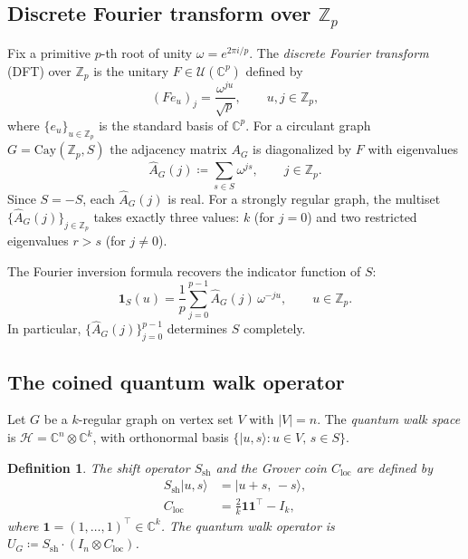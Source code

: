 \documentclass[12pt]{article}
\newtheorem{definition}[theorem]{Definition}
\newcommand{\Z}{\mathbb{Z}}
\newcommand{\C}{\mathbb{C}}
\newcommand{\Cay}{\mathrm{Cay}}
\newcommand{\eqdef}{\coloneqq}
\newcommand{\ket}[1]{|#1\rangle}
\newcommand{\Ahat}{\widehat{A}_G}
\begin{document}
\subsection{Discrete Fourier transform over \texorpdfstring{$\Z_p$}{Zp}}

Fix a primitive $p$-th root of unity $\omega = e^{2\pi i/p}$.  The
\emph{discrete Fourier transform} (DFT) over $\Z_p$ is the unitary
$F \in \mathcal{U}(\C^p)$ defined by
\[
  (Fe_u)_j = \frac{\omega^{ju}}{\sqrt{p}}, \qquad u, j \in \Z_p,
\]
where $\{e_u\}_{u \in \Z_p}$ is the standard basis of $\C^p$.  For a
circulant graph $G = \Cay(\Z_p, S)$ the adjacency matrix $A_G$ is
diagonalized by $F$ with eigenvalues
\[
  \Ahat(j) \eqdef \sum_{s \in S} \omega^{js}, \qquad j \in \Z_p.
\]
Since $S = -S$, each $\Ahat(j)$ is real.  For a strongly regular graph,
the multiset $\{\Ahat(j)\}_{j \in \Z_p}$ takes exactly three values: $k$
(for $j=0$) and two restricted eigenvalues $r > s$ (for $j \neq 0$).

The Fourier inversion formula recovers the indicator function of $S$:
\begin{equation}\label{eq:fourier-inv}
  \mathbf{1}_S(u) = \frac{1}{p}\sum_{j=0}^{p-1} \Ahat(j)\,\omega^{-ju},
  \qquad u \in \Z_p.
\end{equation}
In particular, $\{\Ahat(j)\}_{j=0}^{p-1}$ determines $S$ completely.

\subsection{The coined quantum walk operator}

Let $G$ be a $k$-regular graph on vertex set $V$ with $|V| = n$.  The
\emph{quantum walk space} is $\mathcal{H} = \C^n \otimes \C^k$, with
orthonormal basis $\{\ket{u, s} : u \in V,\, s \in S\}$.

\begin{definition}\label{def:UG}
  The \emph{shift operator} $S_{\mathrm{sh}}$ and the
  \emph{Grover coin} $C_{\mathrm{loc}}$ are defined by
  \begin{align}
    S_{\mathrm{sh}}\ket{u,s} &= \ket{u+s,\,-s}, \label{eq:shift}\\
    C_{\mathrm{loc}}          &= \frac{2}{k}\mathbf{1}\mathbf{1}^\top - I_k,
    \label{eq:coin}
  \end{align}
  where $\mathbf{1} = (1,\ldots,1)^\top \in \C^k$.  The \emph{quantum walk
  operator} is $U_G \eqdef S_{\mathrm{sh}} \cdot (I_n \otimes
  C_{\mathrm{loc}})$.
\end{definition}
\end{document}
